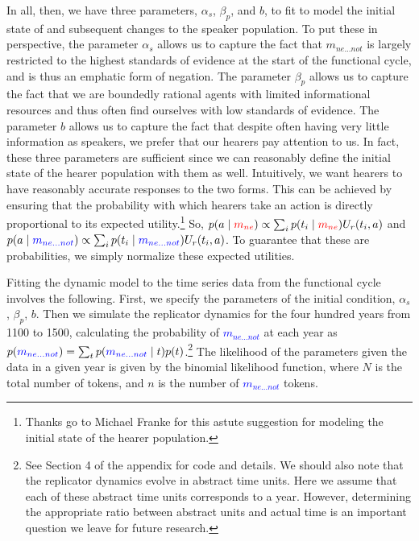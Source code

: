 \documentclass[linguex]{sp}
\theoremstyle{definition} \newtheorem{definition}{Definition}
\begin{document}
In all, then, we have three parameters, $\alpha_{s}$, $\beta_p$, and $b$, to fit to model the initial state of and subsequent changes to the speaker population. To put these in perspective, the parameter $\alpha_{s}$ allows us to capture the fact that \textit{\color{blue} $m_{ne...not}$} is largely restricted to the highest standards of evidence at the start of the functional cycle, and is thus an emphatic form of negation. The parameter $\beta_p$ allows us to capture the fact that we are boundedly rational agents with limited informational resources and thus often find ourselves with low standards of evidence. The parameter $b$ allows us to capture the fact that despite often having very little information as speakers, we prefer that our hearers pay attention to us. In fact, these three parameters are sufficient since we can reasonably define the initial state of the hearer population with them as well. Intuitively, we want hearers to have reasonably accurate responses to the two forms. This can be achieved by ensuring that the probability with which hearers take an action is directly proportional to its expected utility.\footnote{Thanks go to Michael Franke for this astute suggestion for modeling the initial state of the hearer population.} So,  $p(a \mid \textit{\color{red} $m_{ne}$}) \propto \sum_i p(t_i \mid \textit{\color{red} $m_{ne}$}) U_r(t_i, a)$ and $p(a \mid \textit{\color{blue} $m_{ne...not}$}) \propto \sum_i p(t_i \mid \textit{\color{blue} $m_{ne...not}$}) U_r(t_i, a)$. To guarantee that these are probabilities, we simply normalize these expected utilities.

Fitting the dynamic model to the time series data from the functional cycle involves the following. First, we  specify the parameters of the initial condition, $\alpha_{s}$, $\beta_p$, $b$. Then we  simulate the replicator dynamics for the four hundred years from 1100 to 1500, calculating the probability of \textcolor{blue}{$m_{ne...not}$} at each year as $p(\textcolor{blue}{m_{ne...not}}) = \sum_t p(\textcolor{blue}{m_{ne...not}} \mid t) p(t)$.\footnote{See Section 4 of the appendix for code and details. We should also note that the replicator dynamics evolve in abstract time units. Here we assume that each of these abstract time units corresponds to a year. However, determining the appropriate ratio between abstract units and actual time is an important question we leave for future research.}  The likelihood of the parameters given the data in a given year is given by the binomial likelihood function, where $N$ is the total number of tokens, and $n$ is the number of \textcolor{blue}{$m_{ne...not}$} tokens.
\end{document}
